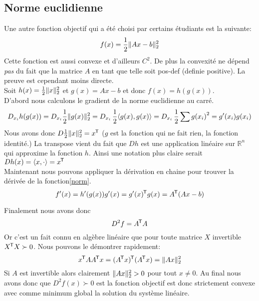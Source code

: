 \clearpage

\subsection{Norme euclidienne}
Une autre fonction objectif qui a été choisi par certains étudiants 
est la suivante:
\begin{equation}
    f(x) = \frac{1}{2} \lVert Ax - b\rVert^2_2 \label{norm}
\end{equation}
Cette fonction est aussi convexe et d'ailleurs $C^2$. De plus la convexit\'e ne
d\'epend \emph{pas} du fait que la matrice $A$ en tant que telle soit pos-def
(definie positive). La preuve est cependant moins directe.\\

Soit $h(x) = \frac{1}{2}\lVert x\rVert^2_2$ et $g(x) = Ax -b$
et donc $f(x) = h(g(x))$.\\

D'abord nous calculons le gradient de la norme euclidienne au carr\'e.
\begin{equation}
    D_{x_i}h(g(x)) =  D_{x_i} \frac{1}{2}\lVert g(x)\rVert_2^2
    = D_{x_i}\, \frac{1}{2} \langle g(x),g(x)\rangle
    = D_{x_i}\, \frac{1}{2} \sum g{(x_i)}^2
    =  g'(x_i)g(x_i)
\end{equation}
Nous avons donc $ D \frac{1}{2} \lVert x\rVert_2^2 = x^{\mkern-1.5mu\mathsf{T}}$ ($g$ est la fonction
qui ne fait rien, la fonction identit\'e.) La transpose vient du
fait que $Dh$ est une application lin\'eaire sur $\mathbb R^n$ qui approxime la
fonction $h$. Ainsi une notation plus claire serait $D h(x) = \langle x,
\cdot\rangle = x^{\mkern-1.5mu\mathsf{T}}$\\


Maintenant nous pouvons appliquer la d\'erivation en chaine pour
trouver la d\'eriv\'ee de la fonction\eqref{norm}.
\begin{equation}
    f'(x) = h'(g(x))g'(x) = g'(x)^{\mkern-1.5mu\mathsf{T}} g(x) = A^{\mkern-1.5mu\mathsf{T}} (Ax-b)
\end{equation}

Finalement nous avons donc 
\begin{equation}
    D^2 f = A^{\mkern-1.5mu\mathsf{T}} A
\end{equation}
Or c'est un fait connu en alg\`ebre lin\'eaire que 
pour toute matrice $X$ invertible $X^{\mkern-1.5mu\mathsf{T}} X \succ 0$. Nous pouvons le
d\'emontrer rapidement:
\begin{equation}
    x^{\mkern-1.5mu\mathsf{T}} AA^{\mkern-1.5mu\mathsf{T}} x = (A^{\mkern-1.5mu\mathsf{T}} x)^{\mkern-1.5mu\mathsf{T}} (A^{\mkern-1.5mu\mathsf{T}} x) = \lVert Ax\rVert_2^2 
\end{equation}
Si $A$ est invertible alors clairement $\lVert Ax\rVert^2_2 > 0$ pour tout
$x\neq 0$. Au final nous avons donc que $D^2 f(x) \succ 0$ est la fonction
objectif est donc strictement convexe avec comme minimum global la solution
du syst\`eme lin\'eaire.\\

